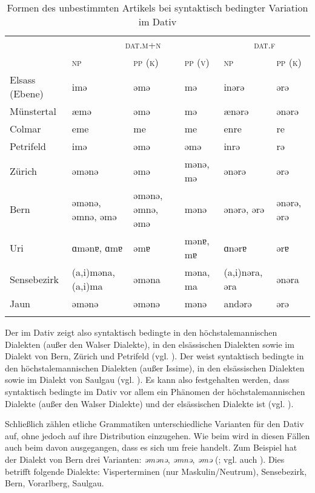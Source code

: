 
\begin{table}
\caption{Formen des unbestimmten Artikels bei syntaktisch bedingter Variation im Dativ}\label{table5.30}
\begin{tabularx}{\textwidth}{l*{5}{X}} 
\lsptoprule
& \multicolumn{3}{c}{\textsc{dat.m+n}} & \multicolumn{2}{c}{\textsc{dat.f}}\\\cmidrule(lr){2-4}\cmidrule(lr){5-6}
& \textsc{np} & \textsc{pp (k)} & \textsc{pp (v)} & \textsc{np} & \textsc{pp (k)}\\
\midrule
Elsass (Ebene) & imə & əmə & mə & inərə & ərə\\
Münstertal & æmə & əmə & mə & ænərə & ənərə\\
Colmar & eme & me & me & enre & re\\
Petrifeld & imə & əmə & əmə & inrə & rə\\
Zürich & əmənə & əmə & mənə, mə & ənərə & ərə\\
Bern & əmənə, əmnə, əmə & əmənə, əmnə, əmə & mənə & ənərə, ərə & ənərə, ərə\\
Uri & ɑmənɐ, ɑmɐ & əmɐ & mənɐ, mɐ & ɑnərɐ & ərɐ\\
Sensebezirk & (a,i)məna, (a,i)ma & əməna & məna, ma & (a,i)nəra, əra & ənəra\\
Jaun & əmənə & əmənə & mənə & andərə & ərə\\
\lspbottomrule
\end{tabularx}
\end{table}

Der  im Dativ zeigt also syntaktisch bedingte  in den höchstalemannischen Dialekten (außer den Walser Dialekte), in den elsässischen Dialekten sowie im Dialekt von Bern, Zürich und Petrifeld (vgl. ). Der  weist syntaktisch bedingte  in den höchstalemannischen Dialekten (außer Issime), in den elsässischen Dialekten sowie im Dialekt von Saulgau (vgl. ). Es kann also festgehalten werden, dass syntaktisch bedingte  im Dativ vor allem ein Phänomen der höchstalemannischen Dialekte (außer den Walser Dialekte) und der elsässischen Dialekte ist (vgl. ).

Schließlich zählen etliche Grammatiken unterschiedliche Varianten für den Dativ auf, ohne jedoch auf ihre Distribution einzugehen. Wie beim  wird in diesen Fällen auch beim  davon ausgegangen, dass es sich um freie  handelt. Zum Beispiel hat der Dialekt von Bern drei Varianten: \textit{əmənə}, \textit{əmnə}, \textit{əmə} (\citealt[79]{Marti1985}; vgl. auch ). Dies betrifft folgende Dialekte: Visperterminen (nur Maskulin/Neutrum), Sensebezirk, Bern, Vorarlberg, Saulgau.

